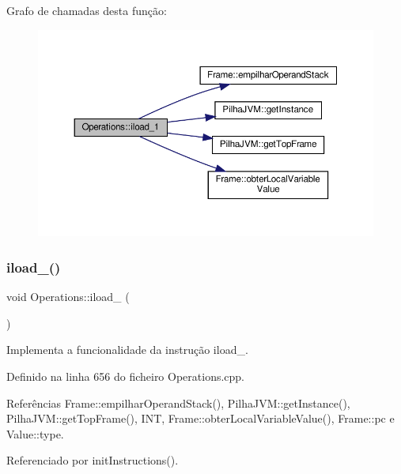 Grafo de chamadas desta função\+:\nopagebreak
\begin{figure}[H]
\begin{center}
\leavevmode
\includegraphics[width=350pt]{classOperations_a4b9d8ef21894c0db2203c06712e97765_cgraph}
\end{center}
\end{figure}
\mbox{\label{classOperations_affa5afeadb98117ea0ee66cf2687eb0a}} 
\subsubsection{\texorpdfstring{iload\+\_()}{iload\_2()}}
{\footnotesize\ttfamily void Operations\+::iload\+\_ (\begin{DoxyParamCaption}{ }\end{DoxyParamCaption})\hspace{0.3cm}{\ttfamily [private]}}



Implementa a funcionalidade da instrução iload\+\_. 



Definido na linha 656 do ficheiro Operations.\+cpp.



Referências Frame\+::empilhar\+Operand\+Stack(), Pilha\+J\+V\+M\+::get\+Instance(), Pilha\+J\+V\+M\+::get\+Top\+Frame(), I\+NT, Frame\+::obter\+Local\+Variable\+Value(), Frame\+::pc e Value\+::type.



Referenciado por init\+Instructions().

